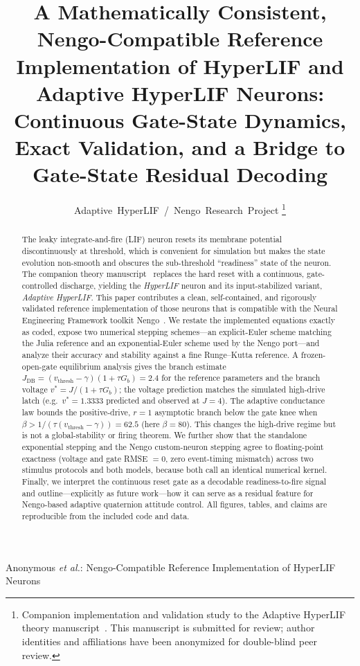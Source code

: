 \documentclass[journal]{IEEEtran}
\newcommand{\vth}{v_{\mathrm{thresh}}}
\newcommand{\Gb}{G_{b}}
\newcommand{\Jdb}{J_{\mathrm{DB}}}
\begin{document}
\title{A Mathematically Consistent, Nengo-Compatible Reference Implementation
of HyperLIF and Adaptive HyperLIF Neurons: Continuous Gate-State Dynamics,
Exact Validation, and a Bridge to Gate-State Residual Decoding}

\author{Adaptive~HyperLIF~/~Nengo~Research~Project%
\thanks{Companion implementation and validation study to the Adaptive HyperLIF
theory manuscript~\cite{hyperlif_theory}. This manuscript is submitted for
review; author identities and affiliations have been anonymized for
double-blind peer review.}}

%
{Anonymous \MakeLowercase{\textit{et al.}}: Nengo-Compatible Reference Implementation of HyperLIF Neurons}

\maketitle

\begin{abstract}
The leaky integrate-and-fire (LIF) neuron resets its membrane potential
discontinuously at threshold, which is convenient for simulation but makes the
state evolution non-smooth and obscures the sub-threshold ``readiness'' state of the
neuron. The companion theory manuscript~\cite{hyperlif_theory} replaces the
hard reset with a continuous, gate-controlled discharge, yielding the
\emph{HyperLIF} neuron and its input-stabilized variant, \emph{Adaptive
HyperLIF}. This paper contributes a clean, self-contained, and rigorously
validated reference implementation of those neurons that is compatible with the
Neural Engineering Framework toolkit Nengo~\cite{bekolay2014nengo}. We restate
the implemented equations exactly as coded, expose two numerical stepping
schemes---an explicit-Euler scheme matching the Julia reference and an
exponential-Euler scheme used by the Nengo port---and analyze their accuracy and
stability against a fine Runge--Kutta reference. A frozen-open-gate equilibrium
analysis gives the branch estimate
$\Jdb=(\vth-\gamma)(1+\tau\Gb)=2.4$ for the reference parameters and the branch
voltage $v^\ast=J/(1+\tau\Gb)$; the voltage prediction matches the simulated
high-drive latch (e.g.\ $v^\ast=1.3333$ predicted and observed at $J=4$). The
adaptive conductance law bounds the positive-drive, $r=1$ asymptotic branch below
the gate knee when $\beta>1/(\tau(\vth-\gamma))=62.5$ (here $\beta=80$). This
changes the high-drive regime but is not a global-stability or firing theorem.
We further show that the standalone exponential stepping
and the Nengo custom-neuron stepping agree to floating-point exactness (voltage
and gate RMSE $=0$, zero event-timing mismatch) across two stimulus protocols
and both models, because both call an identical numerical kernel. Finally, we
interpret the continuous reset gate as a decodable readiness-to-fire signal and
outline---explicitly as future work---how it can serve as a residual feature for
Nengo-based adaptive quaternion attitude control. All figures, tables, and
claims are reproducible from the included code and data.
\end{abstract}
\end{document}
